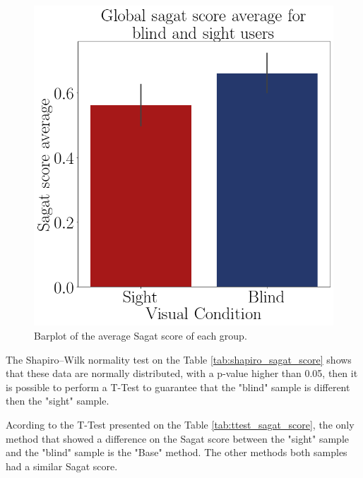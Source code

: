 \begin{figure}[!htb]
\begin{minipage}{.45\linewidth}
        \vspace{1.8cm}
        \centering
        \includegraphics[width = \linewidth]{Resultados/Sagat/Figuras/png/barplot_sagat_avg_global.png}
        \caption{Barplot of the average Sagat score of each group.}
        \label{fig:barplot_sagat}
    \end{minipage}
\end{figure}


The Shapiro–Wilk normality test on the Table \ref{tab:shapiro_sagat_score} shows that these data are normally distributed, with a p-value higher than 0.05, then it is possible to perform a T-Test to guarantee that the "blind" sample is different then the "sight" sample.



Acording to the T-Test presented on the Table \ref{tab:ttest_sagat_score}, the only method that showed a difference on the Sagat score between the "sight" sample and the "blind" sample is the "Base" method. The other methods both samples had a similar Sagat score.

